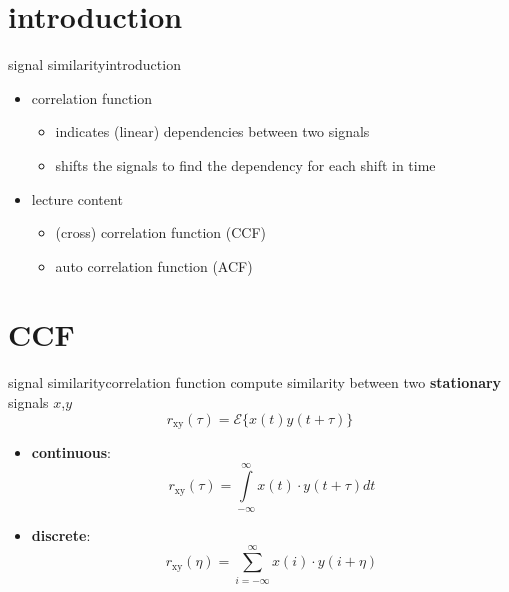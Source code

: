 


\subtitle{Part 5: Signal Similarity --- Correlation}


	

\section{introduction}
\begin{frame}{signal similarity}{introduction}
    \begin{itemize}
        \item   correlation function
            \begin{itemize}
                \item   indicates (linear) dependencies between two signals
                \item   shifts the signals to find the dependency for each shift in time
            \end{itemize}
        \bigskip
        \item lecture content
            \begin{itemize}
                \item (cross) correlation function (CCF)
                \item   auto correlation function (ACF)
            \end{itemize}
            
    \end{itemize}
\end{frame}

\section{CCF}

\begin{frame}{signal similarity}{correlation function}
	compute similarity between two \textbf{stationary} signals $x$,$y$
    \begin{equation*}
        r_\mathrm{xy}(\tau)=\mathcal{E}\lbrace x(t)y(t+\tau)\rbrace  
    \end{equation*}  
	\pause
    
	\begin{itemize}
		\item	\textbf{continuous}:
            \begin{equation*}
                r_\mathrm{xy}(\tau) = \int\limits_{-\infty}^{\infty}{x(t)\cdot y(t+\tau)dt}
            \end{equation*}
		\item	\textbf{discrete}:
            \begin{equation*}
                r_\mathrm{xy}(\eta) = \sum\limits_{i=-\infty}^{\infty}{x(i)\cdot y(i+\eta)}
            \end{equation*}
	\end{itemize}
\end{frame}

